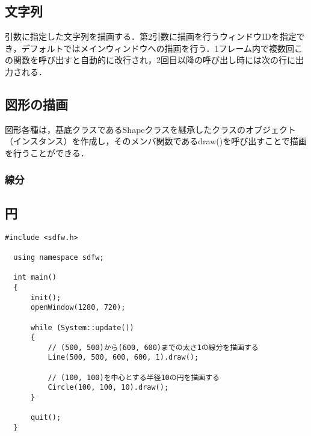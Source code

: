 \documentclass[a4paper, 11pt, oneside, onecolumn, openany]{jsarticle}
\begin{document}
\subsection{文字列}
引数に指定した文字列を描画する．第2引数に描画を行うウィンドウIDを指定でき，デフォルトではメインウィンドウへの描画を行う．1フレーム内で複数回この関数を呼び出すと自動的に改行され，2回目以降の呼び出し時には次の行に出力される．

\subsection{図形の描画}
図形各種は，基底クラスであるShapeクラスを継承したクラスのオブジェクト（インスタンス）を作成し，そのメンバ関数であるdraw()を呼び出すことで描画を行うことができる．

\subsubsection{線分}

\subsection{円}

\begin{lstlisting}[caption=使用例, keepspaces=true]
  #include <sdfw.h>

  using namespace sdfw;
  
  int main()
  {
      init();
      openWindow(1280, 720);
  
      while (System::update())
      {
          // (500, 500)から(600, 600)までの太さ1の線分を描画する
          Line(500, 500, 600, 600, 1).draw();

          // (100, 100)を中心とする半径10の円を描画する
          Circle(100, 100, 10).draw();
      }
  
      quit();
  }
\end{lstlisting}


\end{document}
